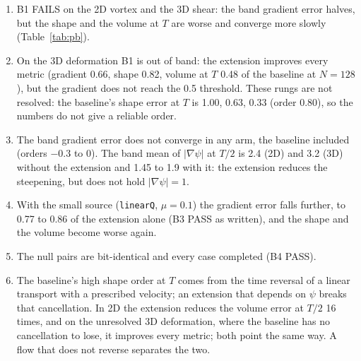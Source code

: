 \begin{enumerate}
\item B1 FAILS on the 2D vortex and the 3D shear: the band gradient error halves, but the shape
and the volume at $T$ are worse and converge more slowly (Table~\ref{tab:pb}).
\item On the 3D deformation B1 is out of band: the extension improves every metric (gradient
0.66, shape 0.82, volume at $T$ 0.48 of the baseline at $N=128$), but the gradient does not reach
the 0.5 threshold. These rungs are not resolved: the baseline's shape error at $T$ is 1.00, 0.63,
0.33 (order 0.80), so the numbers do not give a reliable order.
\item The band gradient error does not converge in any arm, the baseline included (orders
$-0.3$ to 0). The band mean of $|\nabla\psi|$ at $T/2$ is 2.4 (2D) and 3.2 (3D) without the
extension and 1.45 to 1.9 with it: the extension reduces the steepening, but does not hold
$|\nabla\psi|=1$.
\item With the small source (\texttt{linearQ}, $\mu=0.1$) the gradient error falls further, to
0.77 to 0.86 of the extension alone (B3 PASS as written), and the shape and the volume become
worse again.
\item The null pairs are bit-identical and every case completed (B4 PASS).
\item \Hyp{} The baseline's high shape order at $T$ comes from the time reversal of a linear
transport with a prescribed velocity; an extension that depends on $\psi$ breaks that
cancellation. In 2D the extension reduces the volume error at $T/2$ 16 times, and on the
unresolved 3D deformation, where the baseline has no cancellation to lose, it improves every
metric; both point the same way. A flow that does not reverse separates the two.
\end{enumerate}
